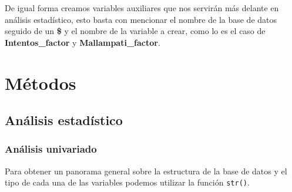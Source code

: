 \documentclass[
]{article}
\newenvironment{Shaded}{\begin{snugshade}}{\end{snugshade}}
\newcommand{\AttributeTok}[1]{\textcolor[rgb]{0.13,0.29,0.53}{#1}}
\newcommand{\DecValTok}[1]{\textcolor[rgb]{0.00,0.00,0.81}{#1}}
\newcommand{\FunctionTok}[1]{\textcolor[rgb]{0.13,0.29,0.53}{\textbf{#1}}}
\newcommand{\NormalTok}[1]{#1}
\newcommand{\OtherTok}[1]{\textcolor[rgb]{0.56,0.35,0.01}{#1}}
\newcommand{\SpecialCharTok}[1]{\textcolor[rgb]{0.81,0.36,0.00}{\textbf{#1}}}
\newcommand{\StringTok}[1]{\textcolor[rgb]{0.31,0.60,0.02}{#1}}
\begin{document}
\begin{Shaded}
\end{Shaded}

De igual forma creamos variables auxiliares que nos servirán más delante
en análisis estadístico, esto basta con mencionar el nombre de la base
de datos seguido de un \textbf{\$} y el nombre de la variable a crear,
como lo es el caso de \textbf{Intentos\_factor} y
\textbf{Mallampati\_factor}.

\hypertarget{muxe9todos}{%
\section{Métodos}\label{muxe9todos}}

\hypertarget{anuxe1lisis-estaduxedstico}{%
\subsection{Análisis estadístico}\label{anuxe1lisis-estaduxedstico}}

\hypertarget{anuxe1lisis-univariado}{%
\subsubsection{Análisis univariado}\label{anuxe1lisis-univariado}}

Para obtener un panorama general sobre la estructura de la base de datos
y el tipo de cada una de las variables podemos utilizar la función
\texttt{str()}.
\end{document}
